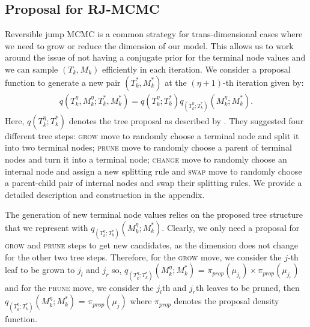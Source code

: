\documentclass[
12pt]{article}
\begin{document}
	\subsection{Proposal for RJ-MCMC}
	
	Reversible jump MCMC is a common strategy for trans-dimensional cases where we need to grow or reduce the dimension of our model. This allows us to work around the issue of not having a conjugate prior for the terminal node values and we can sample $(T_k,M_k)$ efficiently in each iteration. We consider a proposal function to generate a new pair $\left(T_k^{\ast}, M_k^{\ast}\right)$ at the $(\eta+1)$-th iteration given by:
	\begin{align}\label{eq:prop}
		q\left(T_k^{\eta},M_k^{\eta};T_k^{\ast}, M_k^{\ast}\right) = q\left(T_k^{\eta};T_k^{\ast}\right) q_{\left(T_k^{\eta};T_k^{\ast}\right)}\left(M_k^{\eta};M_k^{\ast}\right).
	\end{align}
	Here, $q\left(T_k^{\eta};T_k^{\ast}\right)$ denotes the tree proposal as described by \citet{chipman98BCART}. They suggested four different tree steps: \textsc{grow} move to randomly choose a terminal node and split it into two terminal nodes; \textsc{prune} move to randomly choose a parent of terminal nodes and turn it into a terminal node; \textsc{change} move to randomly choose an internal node and assign a new splitting rule and \textsc{swap} move to randomly choose a parent-child pair of internal nodes and swap their splitting rules. We provide a detailed description and construction in the appendix.
	
	The generation of new terminal node values relies on the proposed tree structure that we represent with $q_{\left(T_k^{\eta};T_k^{\ast}\right)}\left(M_k^{\eta};M_k^{\ast}\right)$. Clearly, we only need a proposal for \textsc{grow} and \textsc{prune} steps to get new candidates, as the dimension does not change for the other two tree steps. Therefore, for the \textsc{grow} move, we consider the $j$-th leaf to be grown to $j_l$ and $j_r$ so,
	$q_{\left(T_k^{\eta};T_k^{\ast}\right)}\left(M_k^{\eta};M_k^{\ast}\right)$ = $\pi_{prop}(\mu_{j_l})\times\pi_{prop}(\mu_{j_r})$ and for the \textsc{prune} move, we consider the $j_l$th and $j_r$th leaves to be pruned, then $q_{\left(T_k^{\eta};T_k^{\ast}\right)}\left(M_k^{\eta};M_k^{\ast}\right)$ = $\pi_{prop}(\mu_j)$
	where $\pi_{prop}$ denotes the proposal density function.
	
\end{document}
